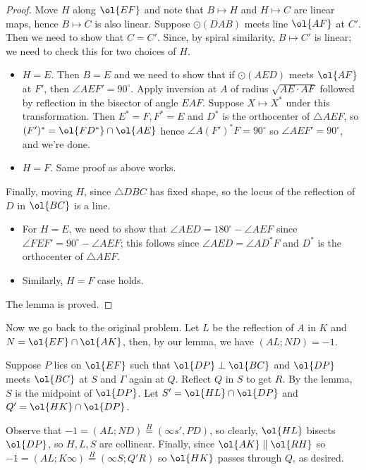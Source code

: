 \begin{proof}
  Move $H$ along $\ol{EF}$ and note that $B \mapsto H$ and $H \mapsto C$
  are linear maps, hence $B \mapsto C$ is also linear.
  Suppose $\odot(DAB)$ meets line $\ol{AF}$ at $C'$.
  Then we need to show that $C=C'$.
  Since, by spiral similarity, $B \mapsto C'$ is linear;
  we need to check this for two choices of $H$.
  \begin{itemize}
    \item $H=E$. Then $B=E$ and we need to show that if $\odot(AED)$ meets $\ol{AF}$ at $F'$, then $\angle AEF'=90^{\circ}$.
    Apply inversion at $A$ of radius $\sqrt{AE \cdot AF}$ followed by reflection in the bisector of angle $EAF$. Suppose $X \mapsto X^{*}$ under this transformation. Then $E^{*}=F, F^{*}=E$ and $D^{*}$ is the orthocenter of $\triangle AEF$, so $(F')^{*}=\ol{FD^{*}} \cap \ol{AE}$ hence $\angle A(F')^{*}F=90^{\circ}$ so $\angle AEF'=90^{\circ}$, and we're done.
    \item $H=F$. Same proof as above works.
  \end{itemize}
  Finally, moving $H$, since $\triangle DBC$ has fixed shape,
  so the locus of the reflection of $D$ in $\ol{BC}$ is a line.
  \begin{itemize}
    \item For $H=E$, we need to show that $\angle AED=180^{\circ}-\angle AEF$ since $\angle FEF'=90^{\circ}-\angle AEF$; this follows since $\angle AED=\angle AD^{*}F$ and $D^{*}$ is the orthocenter of $\triangle AEF$.
    \item Similarly, $H=F$ case holds.
  \end{itemize}
  The lemma is proved.
\end{proof}

Now we go back to the original problem. Let $L$ be the reflection of $A$ in $K$ and $N=\ol{EF} \cap \ol{AK}$, then, by our lemma, we have $(AL; ND)=-1$.

Suppose $P$ lies on $\ol{EF}$ such that $\ol{DP} \perp \ol{BC}$ and $\ol{DP}$ meets $\ol{BC}$ at $S$ and $\Gamma$ again at $Q$. Reflect $Q$ in $S$ to get $R$. By the lemma, $S$ is the midpoint of $\ol{DP}$. Let $S'=\ol{HL} \cap \ol{DP}$ and $Q'=\ol{HK} \cap \ol{DP}$.

Observe that $-1=(AL; ND) \overset{H}{=} (\infty s', PD)$, so clearly, $\ol{HL}$ bisects $\ol{DP}$, so $H, L, S$ are collinear. Finally, since $\ol{AK} \parallel \ol{RH}$ so $-1=(AL; K \infty) \overset{H}{=} (\infty S; Q'R)$ so $\ol{HK}$ passes through $Q$, as desired.

